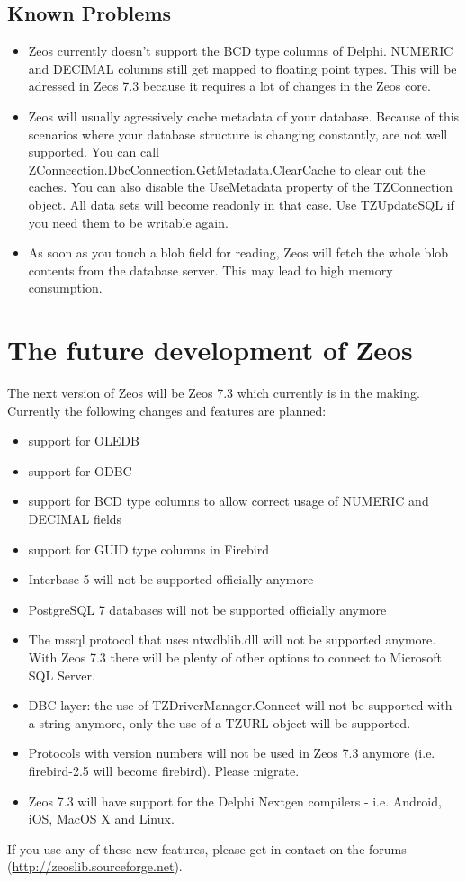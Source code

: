 \documentclass[a4paper,12pt,oneside]{book}
\begin{document}
\section{Known Problems}
\label{sec:Rev4_KnownProblems}
\begin{itemize}
\item 
  Zeos currently doesn't support the BCD type columns of Delphi.
	NUMERIC and DECIMAL columns still get mapped to floating point types.
	This will be adressed in Zeos 7.3 because it requires a lot of changes in the Zeos core.
\item
  Zeos will usually agressively cache metadata of your database.
	Because of this scenarios where your database structure is changing constantly, are not well supported.
	You can call ZConncection.\-DbcConnection.\-GetMetadata.\-ClearCache to clear out the caches.
	You can also disable the UseMetadata property of the TZConnection object.
	All data sets will become readonly in that case.
	Use TZUpdateSQL if you need them to be writable again.
\item
  As soon as you touch a blob field for reading, Zeos will fetch the whole blob contents from the database server.
	This may lead to high memory consumption.
\end{itemize}

\chapter{The future development of Zeos}
\label{chap:FutureDevelopmentOfZeosRev}
The next version of Zeos will be Zeos 7.3 which currently is in the making.
Currently the following changes and features are planned:
\begin{itemize}
\item support for OLEDB
\item support for ODBC
\item support for BCD type columns to allow correct usage of NUMERIC and DECIMAL fields
\item support for GUID type columns in Firebird
\item Interbase 5 will not be supported officially anymore
\item PostgreSQL 7 databases will not be supported officially anymore
\item 
  The mssql protocol that uses ntwdblib.dll will not be supported anymore.
	With Zeos 7.3 there will be plenty of other options to connect to Microsoft SQL Server.
\item DBC layer: the use of TZDriverManager.Connect will not be supported with a string anymore, only the use of a TZURL object will be supported.
\item
  Protocols with version numbers will not be used in Zeos 7.3 anymore (i.e. firebird-2.5 will become firebird).
  Please migrate.
\item
  Zeos 7.3 will have support for the Delphi Nextgen compilers - i.e. Android, iOS, MacOS X and Linux.
\end{itemize}
If you use any of these new features, please get in contact on the forums (\url{http://zeoslib.sourceforge.net}).
\end{document}
